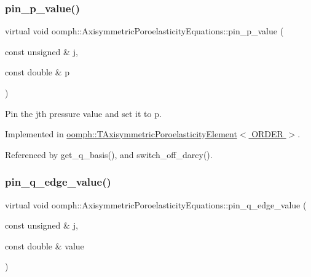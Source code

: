 \subsubsection{\texorpdfstring{pin\+\_\+p\+\_\+value()}{pin\_p\_value()}}
{\footnotesize\ttfamily virtual void oomph\+::\+Axisymmetric\+Poroelasticity\+Equations\+::pin\+\_\+p\+\_\+value (\begin{DoxyParamCaption}\item[{const unsigned \&}]{j,  }\item[{const double \&}]{p }\end{DoxyParamCaption})\hspace{0.3cm}{\ttfamily [pure virtual]}}



Pin the jth pressure value and set it to p. 



Implemented in \hyperlink{classoomph_1_1TAxisymmetricPoroelasticityElement_a8b8bc5b1b5234116a5129f0f9ef4d463}{oomph\+::\+T\+Axisymmetric\+Poroelasticity\+Element$<$ O\+R\+D\+E\+R $>$}.



Referenced by get\+\_\+q\+\_\+basis(), and switch\+\_\+off\+\_\+darcy().

\mbox{\label{classoomph_1_1AxisymmetricPoroelasticityEquations_acf1c7d9fce77306a33838bfc55d899a3}} 
\subsubsection{\texorpdfstring{pin\+\_\+q\+\_\+edge\+\_\+value()}{pin\_q\_edge\_value()}}
{\footnotesize\ttfamily virtual void oomph\+::\+Axisymmetric\+Poroelasticity\+Equations\+::pin\+\_\+q\+\_\+edge\+\_\+value (\begin{DoxyParamCaption}\item[{const unsigned \&}]{j,  }\item[{const double \&}]{value }\end{DoxyParamCaption})\hspace{0.3cm}{\ttfamily [pure virtual]}}



